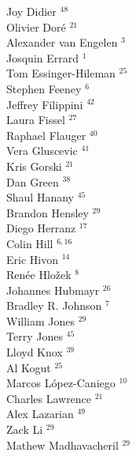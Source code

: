 \documentclass[PICOReport.tex]{subfiles}
\begin{document}
{\begin{multicols}{4}
Joy Didier $^{48}$                      \\
Olivier Dor\'e $^{21}$                  \\
Alexander van Engelen $^{3}$           \\
Josquin Errard $^{1}$                  \\
Tom Essinger-Hileman $^{25}$            \\
Stephen Feeney $^{6}$                  \\
Jeffrey Filippini $^{42}$               \\
Laura Fissel $^{27}$                    \\
Raphael Flauger $^{40}$                 \\
Vera Gluscevic $^{41}$                  \\
Kris Gorski $^{21}$                     \\
Dan Green $^{38}$                       \\
Shaul Hanany $^{45}$                    \\
Brandon Hensley $^{29}$                 \\
Diego Herranz $^{17}$                   \\
Colin Hill $^{6,16}$                      \\
Eric Hivon $^{14}$                      \\
Ren\'{e}e  Hlo\v{z}ek $^{8}$           \\
Johannes Hubmayr $^{26}$                \\
Bradley R. Johnson $^{7}$                    \\
William Jones $^{29}$                   \\
Terry Jones $^{45}$                     \\
Lloyd Knox $^{39}$                      \\
Al Kogut $^{25}$                        \\
Marcos L\'{o}pez-Caniego $^{10}$        \\
Charles Lawrence $^{21}$                \\
Alex Lazarian $^{49}$                   \\
Zack Li $^{29}$                         \\
Mathew Madhavacheril $^{29}$            \\

\end{multicols}}
\end{document}
